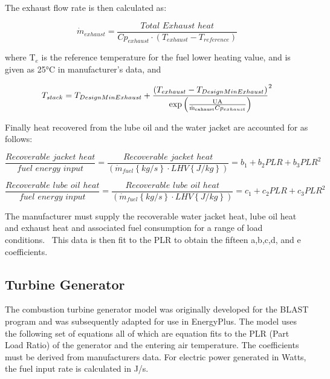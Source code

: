 The exhaust flow rate is then calculated as:

\begin{equation}
{\dot m_{exhaust}} = \frac{{Total\,\,Exhaust\,\,heat}}{{C{p_{exhaust}} \cdot \left( {{T_{exhaust}} - {T_{reference}}} \right)}}
\end{equation}

where T\(_{e}\) is the reference temperature for the fuel lower heating value, and is given as 25°C in manufacturer's data, and

\begin{equation}
{T_{stack}} = {T_{DesignMinExhaust}} + {\frac{{\left( {{T_{exhaust}} - {T_{DesignMinExhaust}}} \right)}}{{{\rm{exp}}\left( {\frac{{{\rm{UA}}}}{{{{{\rm{\dot m}}}_{{\rm{exhaust}}}}C{p_{exhaust}}}}} \right)}}^2}
\end{equation}

Finally heat recovered from the lube oil and the water jacket are accounted for as follows:

\begin{equation}
\frac{{Recoverable\,\,jacket\,\,heat}}{{fuel\,\,energy\,\,input}} = \frac{{Recoverable\,\,jacket\,\,heat}}{{\left( {{{\dot m}_{fuel}}\left\{ {kg/s} \right\} \cdot LHV\left\{ {J/kg} \right\}} \right)}} = {b_1} + {b_2}PLR + {b_3}PL{R^2}
\end{equation}

\begin{equation}
\frac{{Recoverable\,\,lube\,\,oil\,\,heat}}{{fuel\,\,energy\,\,input}} = \frac{{Recoverable\,\,lube\,\,oil\,\,heat}}{{\left( {{{\dot m}_{fuel}}\left\{ {kg/s} \right\} \cdot LHV\left\{ {J/kg} \right\}} \right)}} = {c_1} + {c_2}PLR + {c_3}PL{R^2}
\end{equation}

The manufacturer must supply the recoverable water jacket heat, lube oil heat and exhaust heat and associated fuel consumption for a range of load conditions.~ This data is then fit to the PLR to obtain the fifteen a,b,c,d, and e coefficients.

\subsection{Turbine Generator}\label{turbine-generator}

The combustion turbine generator model was originally developed for the BLAST program and was subsequently adapted for use in EnergyPlus. The model uses the following set of equations all of which are equation fits to the PLR (Part Load Ratio) of the generator and the entering air temperature. The coefficients must be derived from manufacturers data. For electric power generated in Watts, the fuel input rate is calculated in J/s.

